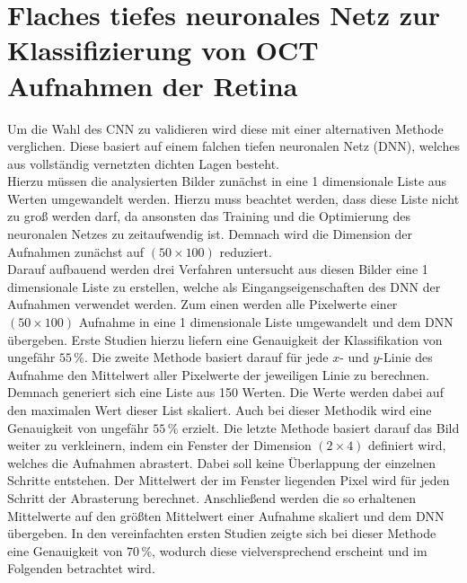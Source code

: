 \section{Flaches tiefes neuronales Netz zur Klassifizierung von OCT Aufnahmen der Retina}

Um die Wahl des CNN zu validieren wird diese mit einer alternativen Methode verglichen. Diese basiert auf einem falchen tiefen neuronalen Netz (DNN), welches aus vollständig vernetzten dichten Lagen besteht. \\
Hierzu müssen die analysierten Bilder zunächst in eine 1 dimensionale Liste aus Werten umgewandelt werden. Hierzu muss beachtet werden, dass diese Liste nicht zu groß werden darf, da ansonsten das Training und die Optimierung des neuronalen Netzes zu zeitaufwendig ist. Demnach wird die Dimension der Aufnahmen zunächst auf $(50\times 100)$ reduziert.\\
Darauf aufbauend werden drei Verfahren untersucht aus diesen Bilder eine 1 dimensionale Liste zu erstellen, welche als Eingangseigenschaften des DNN der Aufnahmen verwendet werden. Zum einen werden alle Pixelwerte einer $(50\times 100)$ Aufnahme in eine 1 dimensionale Liste umgewandelt und dem DNN übergeben. Erste Studien hierzu liefern eine Genauigkeit der Klassifikation von ungefähr $55\,\%$. Die zweite Methode basiert darauf für jede $x$- und $y$-Linie des Aufnahme den Mittelwert aller Pixelwerte der jeweiligen Linie zu berechnen. Demnach generiert sich eine Liste aus 150 Werten. Die Werte werden dabei auf den maximalen Wert dieser List skaliert. Auch bei dieser Methodik wird eine Genauigkeit von ungefähr $55\,\%$ erzielt. Die letzte Methode basiert darauf das Bild weiter zu verkleinern, indem ein Fenster der Dimension $(2\times 4)$ definiert wird, welches die Aufnahmen abrastert. Dabei soll keine Überlappung der einzelnen Schritte entstehen. Der Mittelwert der im Fenster liegenden Pixel wird für jeden Schritt der Abrasterung berechnet. Anschließend werden die so erhaltenen Mittelwerte auf den größten Mittelwert einer Aufnahme skaliert und dem DNN übergeben. In den vereinfachten ersten Studien zeigte sich bei dieser Methode eine Genauigkeit von $70\,\%$, wodurch diese vielversprechend erscheint und im Folgenden betrachtet wird. \\
